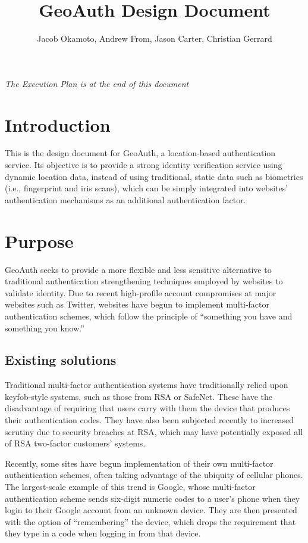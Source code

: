 \documentclass[11pt]{article} %
\title{GeoAuth Design Document}
\author{Jacob Okamoto, Andrew From, Jason Carter, Christian Gerrard}
\begin{document}
\maketitle

\textit{The Execution Plan is at the end of this document}

\section{Introduction}
This is the design document for GeoAuth, a location-based authentication service. Its objective is to provide a strong identity verification service using dynamic location data, instead of using traditional, static data such as biometrics (i.e., fingerprint and iris scans), which can be simply integrated into websites' authentication mechanisms as an additional authentication factor.

\section{Purpose}
GeoAuth seeks to provide a more flexible and less sensitive alternative to traditional authentication strengthening techniques employed by websites to validate identity. Due to recent high-profile account compromises at major websites such as Twitter, websites have begun to implement multi-factor authentication schemes, which follow the principle of ``something you have and something you know.''

\subsection{Existing solutions}
Traditional multi-factor authentication systems have traditionally relied upon keyfob-style systems, such as those from RSA or SafeNet. These have the disadvantage of requiring that users carry with them the device that produces their authentication codes. They have also been subjected recently to increased scrutiny due to security breaches at RSA, which may have potentially exposed all of RSA two-factor customers' systems.

Recently, some sites have begun implementation of their own multi-factor authentication schemes, often taking advantage of the ubiquity of cellular phones. The largest-scale example of this trend is Google, whose multi-factor authentication scheme sends six-digit numeric codes to a user's phone when they login to their Google account from an unknown device. They are then presented with the option of ``remembering'' the device, which drops the requirement that they type in a code when logging in from that device.
\end{document}
